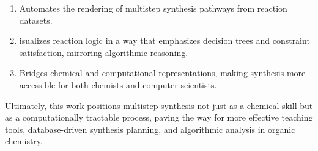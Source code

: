 \documentclass[12pt]{article}
\begin{document}
\begin{enumerate}
    \item Automates the rendering of multistep synthesis pathways from reaction datasets.
    \item isualizes reaction logic in a way that emphasizes decision trees and constraint satisfaction, mirroring algorithmic reasoning.
    \item Bridges chemical and computational representations, making synthesis more accessible for both chemists and computer scientists.
\end{enumerate}
\indent
Ultimately, this work positions multistep synthesis not just as a chemical skill but as a computationally tractable process, paving the way for more effective teaching tools, database-driven synthesis planning, and algorithmic analysis in organic chemistry.
\\
\end{document}
